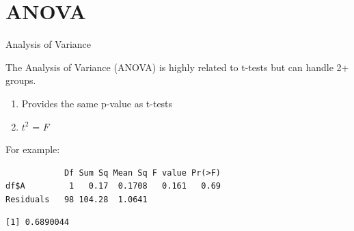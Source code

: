 \section{ANOVA}\label{anova}

\begin{frame}[fragile]{Analysis of Variance}

The Analysis of Variance (ANOVA) is highly related to t-tests but can
handle 2+ groups.

\begin{enumerate}
\def\labelenumi{\arabic{enumi}.}
\tightlist
\item
  Provides the same p-value as t-tests
\item
  \(t^2\) = \(F\)
\end{enumerate}

For example:

\begin{Shaded}
\begin{Highlighting}[]
\StringTok{ }\OperatorTok{$}\OperatorTok{~}\StringTok{ }\OperatorTok{$}
\end{Highlighting}
\end{Shaded}

\begin{verbatim}
            Df Sum Sq Mean Sq F value Pr(>F)
df$A         1   0.17  0.1708   0.161   0.69
Residuals   98 104.28  1.0641               
\end{verbatim}

\begin{Shaded}
\begin{Highlighting}[]
\OperatorTok{$}\OperatorTok{~}\StringTok{ }\OperatorTok{$}\OperatorTok{$}
\end{Highlighting}
\end{Shaded}

\begin{verbatim}
[1] 0.6890044
\end{verbatim}

\end{frame}

